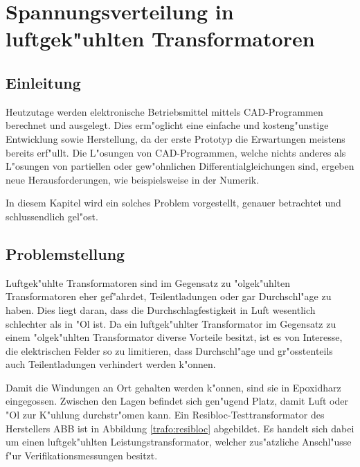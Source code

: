 \chapter{Spannungsverteilung in luftgek"uhlten Transformatoren\label{chapter:thema}}
\begin{refsection}

\section{Einleitung}

Heutzutage werden elektronische Betriebsmittel mittels CAD-Programmen berechnet und ausgelegt. Dies erm"oglicht eine einfache und kosteng"unstige Entwicklung sowie Herstellung, da der erste Prototyp die Erwartungen meistens bereits erf"ullt. Die L"osungen von CAD-Programmen, welche nichts anderes als L"osungen von partiellen oder gew"ohnlichen Differentialgleichungen sind, ergeben neue Herausforderungen, wie beispielsweise in der Numerik. 

In diesem Kapitel wird ein solches Problem vorgestellt, genauer betrachtet und schlussendlich gel"ost.

\section{Problemstellung}

Luftgek"uhlte Transformatoren sind im Gegensatz zu "olgek"uhlten Transformatoren eher gef"ahrdet, Teilentladungen oder gar Durchschl"age zu haben. Dies liegt daran, dass die Durchschlagfestigkeit in Luft wesentlich schlechter als in "Ol ist. Da ein luftgek"uhlter Transformator im Gegensatz zu einem "olgek"uhlten Transformator diverse Vorteile besitzt, ist es von Interesse, die elektrischen Felder so zu limitieren, dass Durchschl"age und gr"osstenteils auch Teilentladungen verhindert werden k"onnen. 
%
%
%
%

Damit die Windungen an Ort gehalten werden k"onnen, sind sie in Epoxidharz eingegossen. Zwischen den Lagen befindet sich gen"ugend Platz, damit Luft oder "Ol zur K"uhlung durchstr"omen kann. Ein Resibloc-Testtransformator des Herstellers ABB ist in Abbildung \ref{trafo:resibloc} abgebildet. Es handelt sich dabei um einen luftgek"uhlten Leistungstransformator, welcher zus"atzliche Anschl"usse f"ur Verifikationsmessungen besitzt. 


\end{refsection}
